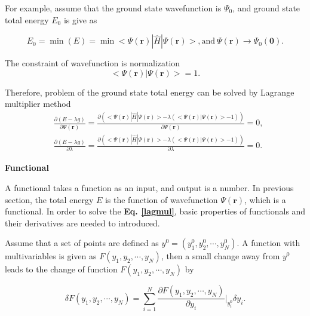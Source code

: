\documentclass[a4paper, 12pt, titlepage,oneside,drop]{kthesis}
\begin{document}
For example, assume that the ground state wavefunction is $\Psi_0$, and ground state total energy $E_0$ is give as

\begin{equation}
 E_0 = \min(E) = \min<\Psi (\textbf{r}) | \widehat{H} | \Psi (\textbf{r})>, \mathrm{and} \  \Psi(\textbf{r}) \longrightarrow \Psi_0(\textbf{0}).
\end{equation}

The constraint of wavefunction is normalization
\begin{equation}
 <\Psi(\textbf{r}) |  \Psi(\textbf{r})> = 1.
\end{equation}

Therefore, problem of the ground state total energy can be solved by Lagrange multiplier method
\begin{equation}\label{lagmul}
\begin{split}
&  \frac{\partial \left( E - \lambda g \right)}{\partial \Psi(\textbf{r})} = \frac{\partial \left( <\Psi (\textbf{r}) | \widehat{H} | \Psi (\textbf{r})> - \lambda (<\Psi(\textbf{r})|\Psi(\textbf{r})>-1) \right)}{\partial \Psi(\textbf{r})} = 0, \\
&  \frac{\partial \left( E - \lambda g \right)}{\partial \lambda} = \frac{\partial \left( <\Psi (\textbf{r}) | \widehat{H} | \Psi (\textbf{r})> - \lambda (<\Psi(\textbf{r})|\Psi(\textbf{r})>-1) \right)}{\partial \lambda} = 0.
\end{split}
\end{equation}

\textbf{Functional}

A functional takes a function as an input, and output is a number. In previous section, the total energy $E$ is the function of wavefunction $\Psi(\textbf{r})$, which is a functional. In order to solve the \textbf{Eq. \ref{lagmul}}, 
basic properties of functionals and their derivatives are needed to introduced.

Assume that a set of points are defined as $y^0 = (y_1^0, y_2^0, \cdots, y_N^0)$. A function with multivariables is given as $F(y_1, y_2, \cdots, y_N)$, then a small change away from $y^0$ leads to the change of
function $F(y_1, y_2, \cdots, y_N)$ by 

\begin{equation}\label{functional1}
\delta F(y_1, y_2, \cdots, y_N) = \sum\limits_{i=1}^N \frac{\partial F(y_1, y_2, \cdots, y_N)}{\partial y_i} {\Big |}_{y_i^0}  \delta {y_i}.
\end{equation}
\end{document}

